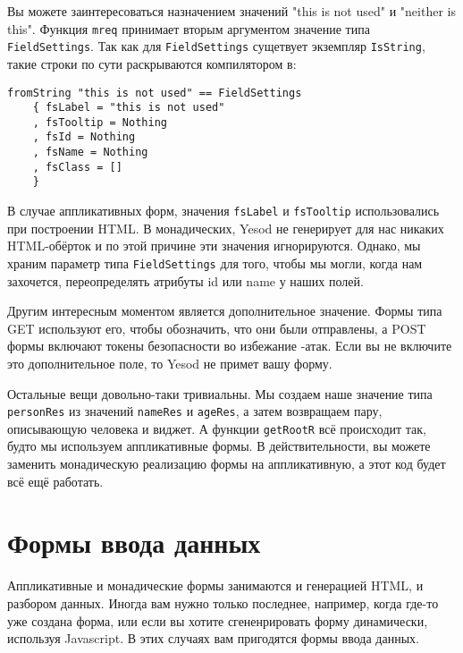 Вы можете заинтересоваться назначением значений "this is not used" и "neither is this".
Функция \lstinline'mreq' принимает вторым аргументом значение типа \lstinline'FieldSettings'.
Так как для \lstinline'FieldSettings' сущетвует экземпляр \lstinline'IsString', такие строки 
по сути раскрываются компилятором в:

\begin{lstlisting}
fromString "this is not used" == FieldSettings
    { fsLabel = "this is not used"
    , fsTooltip = Nothing
    , fsId = Nothing
    , fsName = Nothing
    , fsClass = []
    }
\end{lstlisting}

В случае аппликативных форм, значения \lstinline'fsLabel' и \lstinline'fsTooltip'
использовались при построении HTML. В монадических, Yesod не генерирует для нас
никаких HTML-обёрток и по этой причине эти значения игнорируются. Однако, мы храним 
параметр типа \lstinline'FieldSettings' для того, чтобы мы могли, 
когда нам захочется, переопределять атрибуты id или name у наших полей.

Другим интересным моментом является дополнительное значение. Формы типа GET используют
его, чтобы обозначить, что они были отправлены, а POST формы включают токены безопасности
во избежание 
-атак. 
Если вы не включите это дополнительное поле, то Yesod не примет вашу форму.

Остальные вещи довольно-таки тривиальны. Мы создаем наше значение типа 
\lstinline'personRes' из значений \lstinline'nameRes' и \lstinline'ageRes', а 
затем возвращаем пару, описывающую человека и виджет. А функции \lstinline'getRootR'
всё происходит так, будто мы используем аппликативные формы. В действительности, вы
можете 
заменить монадическую реализацию формы на аппликативную, а этот код будет всё ещё работать.

\section{Формы ввода данных}
Аппликативные и монадические формы занимаются и генерацией HTML, и разбором данных.
Иногда вам нужно только последнее, например, когда где-то уже создана форма, или если вы
хотите сгененрировать форму динамически, используя Javascript. В этих случаях вам пригодятся
формы ввода данных.

